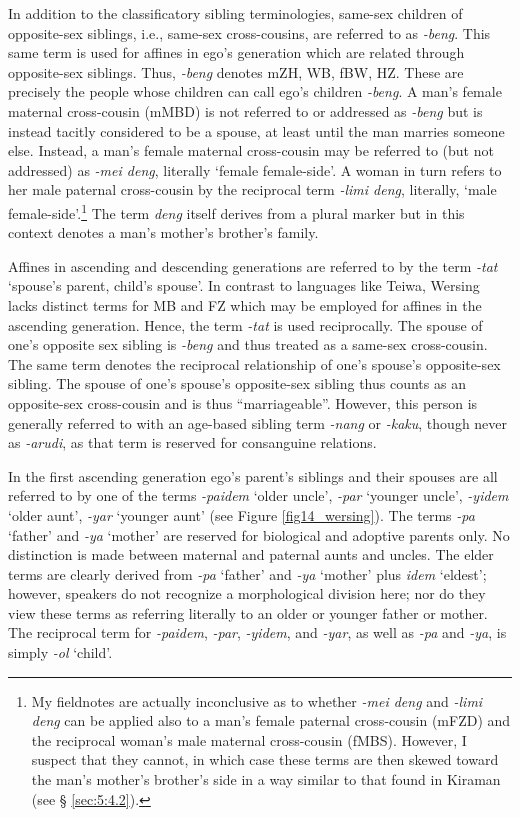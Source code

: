 In addition to the classificatory sibling terminologies, same-sex children of opposite-sex siblings, i.e., same-sex cross-cousins, are referred to as \textit{-beng}. This same term is used for affines in ego's generation which are related through opposite-sex siblings. Thus, \textit{-beng} denotes mZH, WB, fBW, HZ. These are precisely the people whose children can call ego's children \textit{-beng}. A man's female maternal cross-cousin (mMBD) is not referred to or addressed as \textit{-beng} but is instead tacitly considered to be a spouse, at least until the man marries someone else. Instead, a man's female maternal cross-cousin may be referred to (but not addressed) as \textit{-mei deng}, literally `female female-side'. A woman in turn refers to her male paternal cross-cousin by the reciprocal term \textit{-limi deng}, literally, `male female-side'.\footnote{{ }  My fieldnotes are actually inconclusive as to whether \textit{-mei deng} and \textit{-limi deng} can be applied also to a man's female paternal cross-cousin (mFZD) and the reciprocal woman's male maternal cross-cousin (fMBS). However, I suspect that they cannot, in which case these terms are then skewed toward the man's mother's brother's side in a way similar to that found in Kiraman (see {\S} \ref{sec:5:4.2}).}  The term \textit{deng} itself derives from a plural marker but in this context denotes a man's mother's brother's family.

Affines in ascending and descending generations are referred to by the term \textit{-tat} `spouse's parent, child's spouse'. In contrast to languages like Teiwa, Wersing lacks distinct terms for MB and FZ which may be employed for affines in the ascending generation. Hence, the term \textit{-tat} is used reciprocally. The spouse of one's opposite sex sibling is \textit{{}-beng} and thus treated as a same-sex cross-cousin. The same term denotes the reciprocal relationship of one's spouse's opposite-sex sibling. The spouse of one's spouse's opposite-sex sibling thus counts as an opposite-sex cross-cousin and is thus ``marriageable''. However, this person is generally referred to with an age-based sibling term \textit{{}-nang} or \textit{{}-kaku}, though never as \textit{{}-arudi}, as that term is reserved for consanguine relations. 

In the first ascending generation ego's parent's siblings and their spouses are all referred to by one of the terms \textit{-paidem} `older uncle', \textit{-par} `younger uncle', \textit{-yidem} `older aunt', \textit{-yar} `younger aunt' (see Figure \ref{fig14_wersing}). The terms \textit{-pa} `father' and \textit{-ya} `mother' are reserved for biological and adoptive parents only. No distinction is made between maternal and paternal aunts and uncles. The elder terms are clearly derived from \textit{-pa} `father' and \textit{-ya} `mother' plus \textit{idem} `eldest'; however, speakers do not recognize a morphological division here; nor do they view these terms as referring literally to an older or younger father or mother. The reciprocal term for \textit{{}-paidem}, \textit{{}-par}, \textit{{}-yidem}, and \textit{{}-yar}, as well as \textit{-pa} and \textit{{}-ya}, is simply \textit{{}-ol} `child'. 

